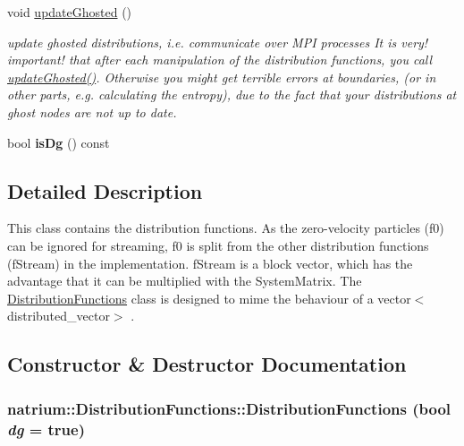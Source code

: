\begin{DoxyCompactItemize}
\item 
\hypertarget{classnatrium_1_1DistributionFunctions_acbfa4e0f94855fb32ad486cddec2d597}{
void \hyperlink{classnatrium_1_1DistributionFunctions_acbfa4e0f94855fb32ad486cddec2d597}{updateGhosted} ()}
\label{classnatrium_1_1DistributionFunctions_acbfa4e0f94855fb32ad486cddec2d597}

\begin{DoxyCompactList}\small\item\em update ghosted distributions, i.e. communicate over MPI processes It is very! important! that after each manipulation of the distribution functions, you call \hyperlink{classnatrium_1_1DistributionFunctions_acbfa4e0f94855fb32ad486cddec2d597}{updateGhosted()}. Otherwise you might get terrible errors at boundaries, (or in other parts, e.g. calculating the entropy), due to the fact that your distributions at ghost nodes are not up to date. \item\end{DoxyCompactList}\item 
\hypertarget{classnatrium_1_1DistributionFunctions_a95ebd185a8c5df260a538206b4db9759}{
bool {\bfseries isDg} () const }
\label{classnatrium_1_1DistributionFunctions_a95ebd185a8c5df260a538206b4db9759}

\end{DoxyCompactItemize}


\subsection{Detailed Description}
This class contains the distribution functions. As the zero-\/velocity particles (f0) can be ignored for streaming, f0 is split from the other distribution functions (fStream) in the implementation. fStream is a block vector, which has the advantage that it can be multiplied with the SystemMatrix. The \hyperlink{classnatrium_1_1DistributionFunctions}{DistributionFunctions} class is designed to mime the behaviour of a vector$<$distributed\_\-vector$>$ . 

\subsection{Constructor \& Destructor Documentation}
\hypertarget{classnatrium_1_1DistributionFunctions_a3c886085011c99c505cdfc4903e20dfd}{
\subsubsection[{DistributionFunctions}]{\setlength{\rightskip}{0pt plus 5cm}natrium::DistributionFunctions::DistributionFunctions (bool {\em dg} = {\ttfamily true})}}
\label{classnatrium_1_1DistributionFunctions_a3c886085011c99c505cdfc4903e20dfd}


